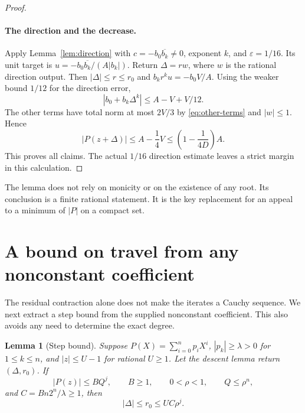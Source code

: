 \documentclass[11pt,letterpaper]{article}
\newtheorem{lemma}[theorem]{Lemma}
\theoremstyle{definition}\newtheorem{definition}[theorem]{Definition}
\theoremstyle{remark}\newtheorem{remark}[theorem]{Remark}
\begin{document}
\begin{proof}
\paragraph{The direction and the decrease.}
Apply Lemma~\ref{lem:direction} with
$c=-b_0\overline{b_k}\ne0$, exponent $k$, and $\varepsilon=1/16$.
Its unit target is
$u=-b_0\overline{b_k}/(A|b_k|)$.
Return $\Delta=rw$, where $w$ is the rational direction output.
Then $|\Delta|\le r\le r_0$ and
$b_kr^ku=-b_0V/A$. Using the weaker bound $1/12$ for the direction error,
\[
 |b_0+b_k\Delta^k|\le A-V+V/12.
\]
The other terms have total norm at most $2V/3$ by
\eqref{eq:other-terms} and $|w|\le1$. Hence
\[
 |P(z+\Delta)|\le A-\frac14V
       \le\left(1-\frac1{4D}\right)A.
\]
This proves all claims. The actual $1/16$ direction estimate leaves a
strict margin in this calculation.
\end{proof}

The lemma does not rely on monicity or on the existence of any root. Its
conclusion is a finite rational statement. It is the key replacement for
an appeal to a minimum of $|P|$ on a compact set.

\section{A bound on travel from any nonconstant coefficient}
\label{sec:travel}

The residual contraction alone does not make the iterates a Cauchy sequence.
We next extract a step bound from the supplied nonconstant coefficient. This
also avoids any need to determine the exact degree.

\begin{lemma}[Step bound]
\label{lem:step-bound}
Suppose $P(X)=\sum_{i=0}^n p_iX^i$, $|p_k|\ge\lambda>0$ for
$1\le k\le n$, and $|z|\le U-1$ for rational $U\ge1$.
Let the descent lemma return $(\Delta,r_0)$. If
\[
 |P(z)|\le BQ^j,\qquad B\ge1,\qquad 0<\rho<1,
 \qquad Q\le\rho^n,
\]
and $C=Bn2^n/\lambda\ge1$, then
\[
 |\Delta|\le r_0\le UC\rho^j.
\]
\end{lemma}
\end{document}

